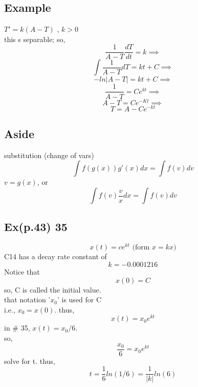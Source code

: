 \subsection*{Example}
$T' = k(A-T)$ , $k>0$ \\
this s separable; so,  \\
$$\frac{1}{A-T} \frac{dT}{dt} = k \implies $$
$$\int \frac{1}{A-T} dT = kt + C \implies$$
$$-ln|A-T| = kt + C \implies $$
$$\frac{1}{A-T} = Ce^{kt} \implies$$
$$A-T = Ce^{-Kt} \implies $$
$$T = A-Ce^{-kt}$$


\subsection*{Aside}
substitution (change of vars)
$$\int f(g(x))g'(x)dx = \int f(v)dv$$
$v=g(x)$, or
$$\int f(v)\frac{v}{x} dx = \int f(v)dv$$

\newpage 
{}
  \subsection*{Ex(p.43) 35}
  $$x(t)=ce^{kt} \text{ (form } x=kx)$$
  C14 has a decay rate constant of 
  $$k = -0.0001216$$
  Notice that 
  $$x(0) = C$$
  so, C is called the initial value. \\
  that notation '$x_0$' is used for C \\
  i.e., $x_0 = x(0)$. thus,  \\
  $$x(t)=x_0e^{kt}$$ 
  in \# 35, $x(t) = x_0/6.$ \\
  so, 
  $$\frac{x_0}{6}= x_0e^{kt}$$
  solve for t. thus, 
  $$t=\frac{1}{6}ln(1/6)=\frac{1}{|k|}ln(6)$$
  
